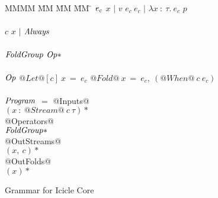 
\begin{figure}

\begin{tabbing}
MMMM \= MM \= MM \= MM \= \kill
$\mathit{e_c}$
\GrammarDef $x$ \> $|$ \> $v$
\GrammarAlt $e_c~e_c$ \> $|$ \> $\lambda{}x~:~\tau.~e_c$
\GrammarAlt $p$
\\
\\
$c$
\GrammarDef $x$ \> $|$ \> $\mathit{Always}$
\\
\\
$\mathit{FoldGroup}$
\GrammarDef $\mathit{Op}*$
\\
\\
$\mathit{Op}$
\GrammarDef $@Let@[c]~x~=~e_c$
\GrammarAlt $@Fold@~x~=~e_c,~(@When@~c~e_c)$
\\
\\
$\mathit{Program}$
    \> $=$  \> @Inputs@ \\
    \>      \> \> $(x~:~@Stream@~c~\tau)*$ \\
    \>      \> @Operators@ \\
    \>      \> \> $\mathit{FoldGroup}*$ \\
    \>      \> @OutStreams@ \\
    \>      \> \> $(x,~c)*$ \\
    \>      \> @OutFolds@ \\
    \>      \> \> $(x)*$ \\
\end{tabbing}


\caption{Grammar for Icicle Core}
\label{fig:core:grammar}
\end{figure}

